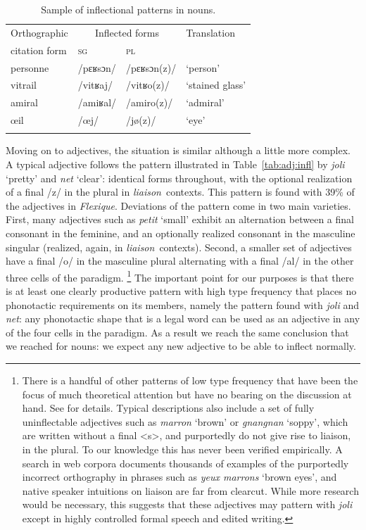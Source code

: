 \documentclass[output=paper,colorlinks,citecolor=brown]{langscibook}
\begin{document}
\begin{table}
	\centering
	\begin{tabular}{llll}
		\lsptoprule
		Orthographic & \multicolumn{2}{c}{Inflected forms} & Translation \\
		citation form & \textsc{sg} & \textsc{pl} &\\
		\midrule
		personne & /pɛʁsɔn/ & /pɛʁsɔn(z)/ & ‘person’\\
		vitrail & /vitʁaj/ & /vitʁo(z)/ & ‘stained glass’\\
		amiral & /amiʁal/ & /amiro(z)/ & ‘admiral’\\
		œil & /œj/ & /jø(z)/ & ‘eye’\\
		\lspbottomrule
	\end{tabular}
	\caption{Sample of inflectional patterns in  nouns.\label{tab:noun:infl}}
\end{table}

\largerpage[1]

Moving on to adjectives, the situation is similar although a little more complex. A typical  adjective follows the pattern illustrated in Table~\ref{tab:adj:infl} by \emph{joli} ‘pretty’ and \emph{net} ‘clear’: identical forms throughout, with the optional realization of a final /z/ in the plural in \emph{liaison} contexts. This pattern is found with 39\% of the adjectives in \emph{Flexique}. Deviations of the pattern come in two main varieties. First, many adjectives such as \emph{petit} ‘small’ exhibit an alternation between a final consonant in the feminine, and an optionally realized consonant in the masculine singular (realized, again, in \emph{liaison} contexts). Second, a smaller set of adjectives have a final /o/ in the masculine plural alternating with a final /al/ in the other three cells of the paradigm.%
\footnote{There is a handful of other patterns of low type frequency that have been the focus of much theoretical attention but have no bearing on the discussion at hand. See \citet{bonamiboye2005} for details. Typical descriptions also include a set of fully uninflectable adjectives such as \emph{marron} ‘brown’ or \emph{gnangnan} ‘soppy’, which are written without a final <s>, and  purportedly do not give rise to liaison, in the plural. To our knowledge this has never been verified empirically. A search in web corpora documents thousands of examples of the purportedly incorrect orthography in phrases such as \emph{yeux marrons} ‘brown eyes’, and native speaker intuitions on liaison are far from clearcut. While more research would be necessary, this suggests that these adjectives may pattern with \emph{joli} except in highly controlled formal speech and edited writing.}
The important point for our purposes is that there is at least one clearly productive pattern with high type frequency that places no phonotactic requirements on its members, namely the pattern found with \emph{joli} and \emph{net}: any phonotactic shape that is a legal  word can be used as an adjective in any of the four cells in the paradigm. As a result we reach the same conclusion that we reached for nouns: we expect any new adjective to be able to inflect normally.
\end{document}

